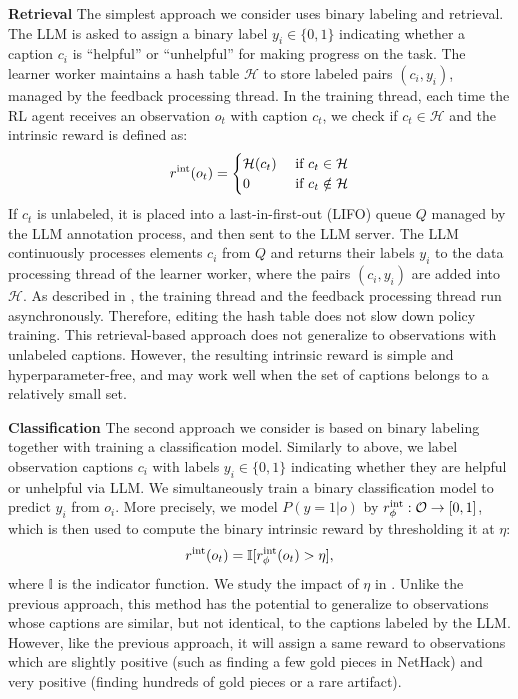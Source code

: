 \textbf{Retrieval} The simplest approach we consider uses binary labeling and retrieval. 
The LLM is asked to assign a binary label $y_i \in \{0, 1\}$ indicating whether a caption $c_i$ is ``helpful'' or ``unhelpful'' for making progress on the task. The learner worker maintains a hash table $\mathcal{H}$ to store labeled pairs $(c_i, y_i)$, managed by the feedback processing thread.
%
In the training thread, each time the RL agent receives an observation $o_t$ with caption $c_t$, we check if $c_t \in \mathcal{H}$ and
%
the intrinsic reward is defined as:
\begin{equation}
    r^\mathrm{int}(o_t) = \begin{cases}
    \mathcal{H}(c_t) & \mbox{ if } c_t \in \mathcal{H}\\
    0 & \mbox{ if } c_t \notin \mathcal{H}
    \end{cases}
\end{equation}
If $c_t$ is unlabeled, it is placed into a last-in-first-out (LIFO) queue $Q$ managed by the LLM annotation process,
and then sent to the LLM server. 
The LLM continuously processes elements $c_i$ from $Q$ and returns their labels $y_i$ to the data processing thread of the learner worker, where the pairs $(c_i, y_i)$ are added into $\mathcal{H}$. As described in , the training thread and the feedback processing thread run asynchronously. Therefore, editing the hash table does not slow down policy training. %
This retrieval-based approach does not generalize to observations with unlabeled captions. However, the resulting intrinsic reward is simple and hyperparameter-free, and may work well when the set of captions belongs to a relatively small set.
%

\textbf{Classification} The second approach we consider is based on binary labeling together with training a classification model. Similarly to above, we label observation captions $c_i$ with labels $y_i \in \{0, 1\}$ indicating whether they are helpful or unhelpful via LLM. 
We simultaneously train a binary classification model
to predict $y_i$ from $o_i$. More precisely, we model $P(y = 1|o)$ by $r^\mathrm{int}_\phi: \mathcal{O} \rightarrow [0, 1]$,
%
which is then used to compute the binary intrinsic reward by thresholding it at $\eta$: 
\begin{equation}
 r^\mathrm{int}(o_t) = \mathbb{I}[r^\mathrm{int}_\phi(o_t) > \eta],
\end{equation}
where $\mathbb{I}$ is the indicator function. We study the impact of $\eta$ in . Unlike the previous approach, this method has the potential to generalize to observations whose captions are similar, but not identical, to the captions labeled by the LLM. However, like the previous approach, it will assign a same reward to observations which are slightly positive (such as finding a few gold pieces in NetHack) and very positive (finding hundreds of gold pieces or a rare artifact). 

